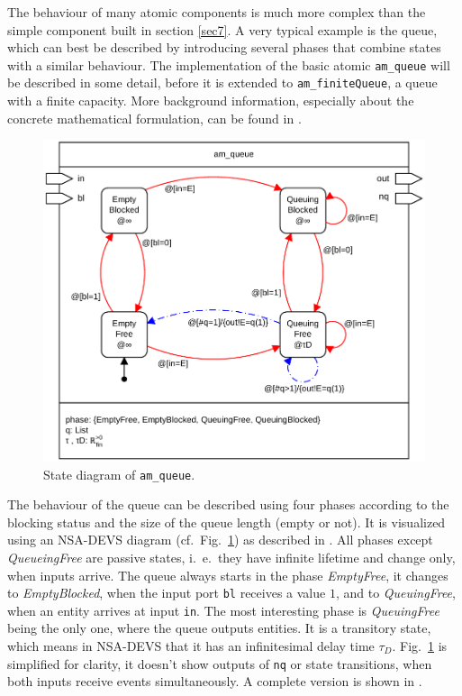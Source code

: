 \documentclass[12pt,oneside,a4paper,bibtotoc,BCOR=0pt,DIV=20]{scrreprt}
\newcommand{\cft}[1]{\mbox{\texttt{#1}}}   %
\begin{document}
The behaviour of many atomic components is much more complex than the simple
component built in section \ref{sec7}. A very typical example is the queue,
which can best be described by introducing several phases that combine states
with a similar behaviour. The implementation of the basic atomic
\cft{am\_queue} will be described in some detail, before it is extended to
\cft{am\_finiteQueue}, a queue with a finite capacity. More background
information, especially about the concrete mathematical formulation, can be
found in \cite{nsaExamples}.

\begin{figure}[ht]
\centering
\includegraphics[width=0.76\columnwidth]{images/bild21.pdf}
\caption{State diagram of \cft{am\_queue}.}
\label{fig_21}
\end{figure}

The behaviour of the queue can be described using four phases according to the
blocking status and the size of the queue length (empty or not). It is
visualized using an NSA-DEVS diagram (cf.\ Fig.\ \ref{fig_21}) as described in
\cite{nsaDiagram}. All phases except \emph{QueueingFree} are passive states,
i.\ e.\ they have infinite lifetime and change only, when inputs arrive. The
queue always starts in the phase \emph{EmptyFree}, it changes to
\emph{EmptyBlocked}, when the input port \cft{bl} receives a value $1$, and to
\emph{QueuingFree}, when an entity arrives at input \cft{in}.  The most
interesting phase is \emph{QueuingFree} being the only one, where the queue
outputs entities. It is a transitory state, which means in NSA-DEVS that it has
an infinitesimal delay time $\tau_D$. Fig.\ \ref{fig_21} is simplified for
clarity, it doesn't show outputs of \cft{nq} or state transitions, when both
inputs receive events simultaneously. A complete version is shown in
\cite{nsaDiagram}.
\end{document}
